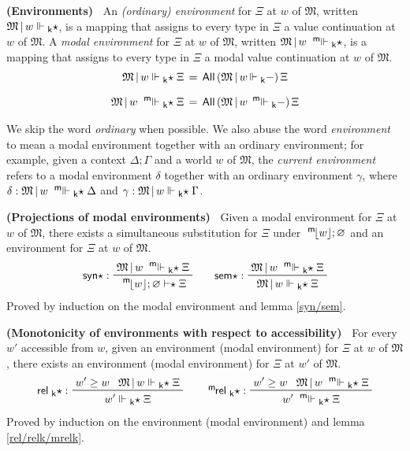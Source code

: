 \documentclass{entcs}
\numberwithin{equation}{thm}
\newcommand{\preop}[1]{\mathord{#1}-}
\newcommand{\tsf}[1]{\textsf{\upshape{#1}}}
\newcommand{\stsf}[1]{\tsf{\small{#1}}}
\renewcommand{\:}{\mathrel{:}}
\newcommand{\tyrule}[1]{\prftree[l]{${#1} \:\,$}}
\newcommand{\0}{\varnothing}
\newcommand{\All}{\operatorname{\tsf{All}}}
\newcommand{\es}{\mathrel{\vdash\mkern-5mu\star}}
\newcommand{\M}{\mathfrak{M}}
\newcommand{\mpeek}[1]{\mathopen{^{\stsf{m}\mkern-3mu}\lfloor}{#1}\mathclose{\rfloor}}
\newcommand{\eek}{\mathrel{\Vdash_{\stsf{k}}}}
\newcommand{\meek}{\mathrel{^{\stsf{m}\mkern-6mu}\Vdash_{\stsf{k}}}}
\newcommand{\eeks}{\mathrel{\Vdash_{\stsf{k}}\mkern-5mu\star}}
\newcommand{\meeks}{\mathrel{^{\stsf{m}\mkern-6mu}\Vdash_{\stsf{k}}\mkern-5mu\star}}
\newcommand{\syns}{\operatorname{\tsf{syn}\star}}
\newcommand{\sems}{\operatorname{\tsf{sem}\star}}
\newcommand{\relks}{\operatorname{\tsf{rel}_{\stsf{k}}\star}}
\newcommand{\mrelks}{\operatorname{^{\stsf{m}\mkern-2mu}\tsf{rel}_{\stsf{k}}\star}}
\begin{document}
\begin{definition}
  \textbf{(Environments)\ }
  \label{eeks/meeks}
  An \emph{(ordinary) environment} for $\Xi$ at $w$ of $\M$, written $\M\,|\,w \eeks$, is a mapping that assigns to every type in $\Xi$ a value continuation at $w$ of $\M$.
  A \emph{modal environment} for $\Xi$ at $w$ of $\M$, written $\M\,|\,w \meeks$, is a mapping that assigns to every type in $\Xi$ a modal value continuation at $w$ of $\M$.
  \begin{gather*}
    \M\,|\,w \eeks \Xi  \,=\, \All\, (\M\,|\,w\, \preop{\eek})\, \Xi\\[0.5\baselineskip]
    \M\,|\,w \meeks \Xi \,=\, \All\, (\M\,|\,w\, \preop{\meek})\, \Xi
  \end{gather*}
\end{definition}

\noindent
We skip the word \emph{ordinary} when possible.  We also abuse the word \emph{environment} to mean a modal environment together with an ordinary environment; for example, given a context $\Delta; \Gamma$ and a world $w$ of $\M$, the \emph{current environment} refers to a modal environment $\delta$ together with an ordinary environment $\gamma$, where $\delta : \M\,|\,w \meeks \Delta$ and $\gamma : \M\,|\,w \eeks \Gamma$.

\begin{lemma}
  \normalshape
  \textbf{(Projections of modal environments)\ }
  \label{syns/sems}
  Given a modal environment for $\Xi$ at $w$ of $\M$, there exists a simultaneous substitution for $\Xi$ under $\mpeek{w}; \0$ and an environment for $\Xi$ at $w$ of $\M$.
  \begin{gather*}
    \tyrule{\syns}{\M\,|\, w \meeks \Xi}{\mpeek{w}; \0 \es \Xi}\qquad
    \tyrule{\sems}{\M\,|\, w \meeks \Xi}{\M\,|\, w \eeks \Xi}
  \end{gather*}
  Proved by induction on the modal environment and lemma \ref{syn/sem}.
\end{lemma}

\begin{lemma}
  \normalshape
  \textbf{(Monotonicity of environments with respect to accessibility)\ }
  \label{relks/mrelks}
  For every $w'$ accessible from $w$, given an environment (modal environment) for $\Xi$ at $w$ of $\M$, there exists an environment (modal environment) for $\Xi$ at $w'$ of $\M$.
  \begin{gather*}
    \tyrule{\relks}{w' \ge w}{\M\,|\, w \eeks \Xi}{w' \eeks \Xi}\qquad
    \tyrule{\mrelks}{w' \ge w}{\M\,|\, w \meeks \Xi}{w' \meeks \Xi}
  \end{gather*}
  Proved by induction on the environment (modal environment) and lemma \ref{rel/relk/mrelk}.
\end{lemma}
\end{document}
